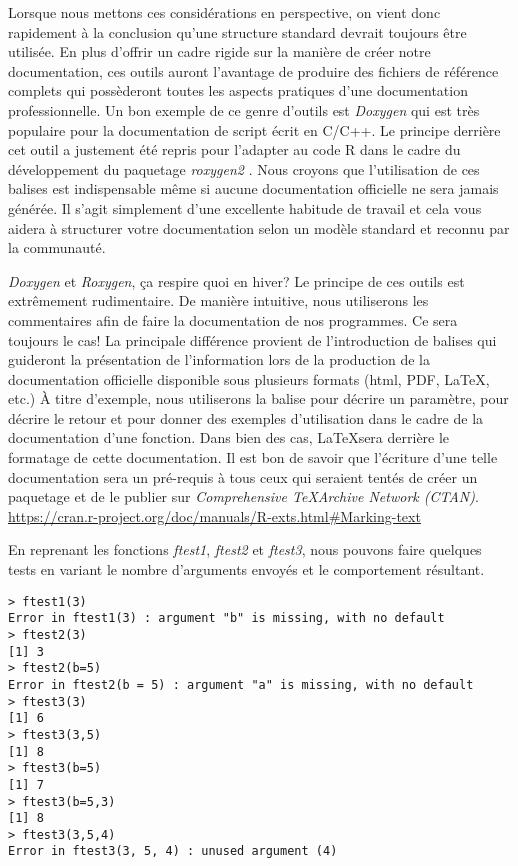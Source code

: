 \noindent
Lorsque nous mettons ces considérations en perspective, on vient donc rapidement à la conclusion qu'une structure standard devrait toujours être utilisée. En plus d'offrir un cadre rigide sur la manière de créer notre documentation, ces outils auront l'avantage de produire des fichiers de référence complets qui possèderont toutes les aspects pratiques d'une documentation professionnelle. Un bon exemple de ce genre d'outils est \emph{Doxygen} \cite{doxygen} qui est très populaire pour la documentation de script écrit en C/C++. Le principe derrière cet outil a justement été repris pour l'adapter au code R dans le cadre du développement du paquetage \emph{roxygen2} \cite{roxygen2}. Nous croyons que l'utilisation de ces balises est indispensable même si aucune documentation officielle ne sera jamais générée. Il s'agit simplement d'une excellente habitude de travail et cela vous aidera à structurer votre documentation selon un modèle standard et reconnu par la communauté.\\

\begin{moreInfo}{\emph{Doxygen} et \emph{Roxygen}, ça respire quoi en hiver?}
	Le principe de ces outils est extrêmement rudimentaire. De manière intuitive, nous utiliserons les commentaires afin de faire la documentation de nos programmes. Ce sera toujours le cas! La principale différence provient de l'introduction de balises qui guideront la présentation de l'information lors de la production de la documentation officielle disponible sous plusieurs formats (html, PDF, \LaTeX, etc.) À titre d'exemple, nous utiliserons la balise \@param pour décrire un paramètre, \@return pour décrire le retour et \@examples pour donner des exemples d'utilisation dans le cadre de la documentation d'une fonction. Dans bien des cas, \LaTeX sera derrière le formatage de cette documentation. Il est bon de savoir que l'écriture d'une telle documentation sera un pré-requis à tous ceux qui seraient tentés de créer un paquetage et de le publier sur \emph{Comprehensive \TeX Archive Network (CTAN)}. \\
	\url{https://cran.r-project.org/doc/manuals/R-exts.html#Marking-text}
\end{moreInfo}

\noindent
En reprenant les fonctions \emph{ftest1}, \emph{ftest2} et \emph{ftest3}, nous pouvons faire quelques tests en variant le nombre d'arguments envoyés et le comportement résultant.

\begin{lstlisting}[caption = Passage d'arguments à une fonction,label=src:callFctParam]
> ftest1(3)
Error in ftest1(3) : argument "b" is missing, with no default
> ftest2(3)
[1] 3
> ftest2(b=5)
Error in ftest2(b = 5) : argument "a" is missing, with no default
> ftest3(3)
[1] 6
> ftest3(3,5)
[1] 8
> ftest3(b=5)
[1] 7
> ftest3(b=5,3)
[1] 8
> ftest3(3,5,4)
Error in ftest3(3, 5, 4) : unused argument (4)
\end{lstlisting}

